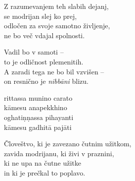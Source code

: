 Z razumevanjem teh slabih dejanj,\\
se modrijan slej ko prej,\\
odločen za svoje samotno življenje,\\
ne bo več vdajal spolnosti.

Vadil bo v samoti --\\
to je odličnost plemenitih.\\
A zaradi tega ne bo bil vzvišen --\\
on resnično je \emph{nibbāni} blizu.


\clearpage

rittassa munino carato\\
kāmesu anapekkhino\\
oghatiṇṇassa pihayanti\\
kāmesu gadhitā pajāti


\clearpage

Človeštvo, ki je zavezano čutnim užitkom,\\
zavida modrijanu, ki živi v praznini,\\
ki ne upa na čutne užitke\\
in ki je prečkal to poplavo.

